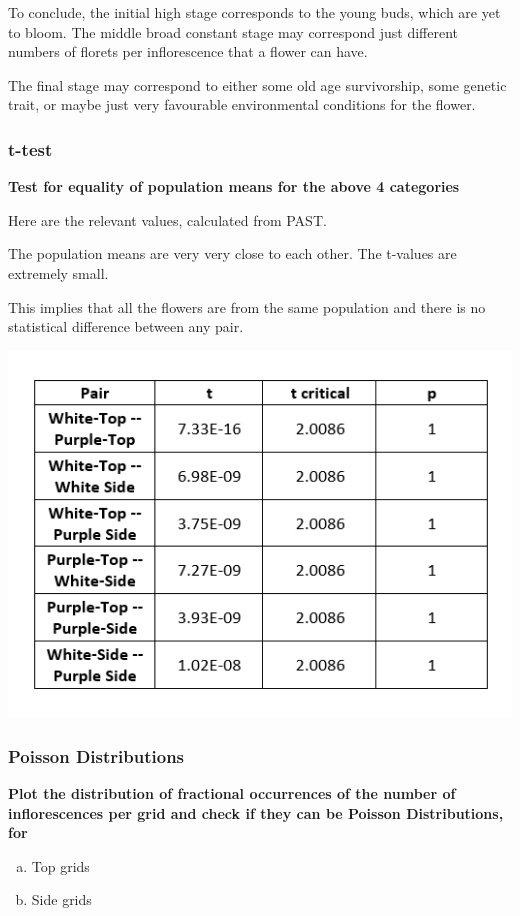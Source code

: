 \documentclass[twocolumn]{article}
\begin{document}
To conclude, the initial high stage corresponds to the young buds, which are yet to bloom. The middle broad constant stage may correspond just different numbers of florets per inflorescence that a flower can have. 

The final stage may correspond to either some old age survivorship, some genetic trait, or maybe just very favourable environmental conditions for the flower.

\subsubsection{t-test}

\textbf{Test for equality of population means for the above 4 categories}


Here are the relevant values, calculated from PAST. 


The population means are very very close to each other. The t-values are extremely small. 

This implies that all the flowers are from the same population and there is no statistical difference between any pair.

\includegraphics[width = \linewidth]{t-values.png}

\subsubsection{Poisson Distributions}

\textbf{Plot the distribution of fractional occurrences of the number of inflorescences per grid and check if they can be Poisson Distributions, for}
\begin{enumerate}[a)]
    \item Top grids
    \item Side grids 
\end{enumerate}
\end{document}
